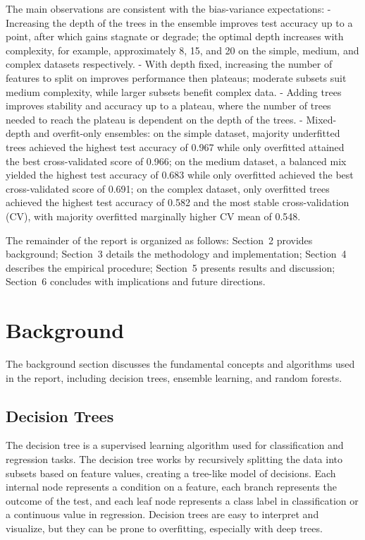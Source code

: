 \documentclass[conference]{IEEEtran}
\begin{document}
The main observations are consistent with the bias-variance expectations:
- Increasing the depth of the trees in the ensemble improves test accuracy up to a point, after which gains stagnate or degrade; the optimal 
depth increases with complexity, for example, approximately 8, 15, and 20 on the simple, medium, and complex datasets respectively.
- With depth fixed, increasing the number of features to split on improves performance then plateaus; moderate subsets suit medium complexity,
 while larger subsets benefit complex data.
- Adding trees improves stability and accuracy up to a plateau, where the number of trees needed to reach the plateau is dependent on the depth 
of the trees.
- Mixed-depth and overfit-only ensembles: on the simple dataset, majority underfitted trees achieved the highest test accuracy of 0.967 while 
only overfitted attained the best cross-validated score of 0.966; on the medium dataset, a balanced mix yielded the highest test accuracy 
of 0.683 while only overfitted achieved the best cross-validated score of 0.691; on the complex dataset, only overfitted trees achieved the highest test
 accuracy of 0.582 and the most stable cross-validation (CV), with majority overfitted marginally higher CV mean of 0.548.

The remainder of the report is organized as follows: Section~2 provides background; Section~3 details the methodology and implementation; 
Section~4 describes the empirical procedure; Section~5 presents results and discussion; Section~6 concludes with implications and future directions.

\section{Background}
The background section discusses the fundamental concepts and algorithms used in the report, including decision trees, ensemble learning, and 
random forests.

\subsection{Decision Trees}
The decision tree is a supervised learning algorithm used for classification and regression tasks. The decision tree works by recursively 
splitting the data into subsets based on feature values, creating a tree-like model of decisions. Each internal node represents a condition on a 
feature, each branch represents the outcome of the test, and each leaf node represents a class label in classification or a continuous value 
in regression. Decision trees are easy to interpret and visualize, but they can be prone to overfitting, especially with deep trees.
\end{document}

